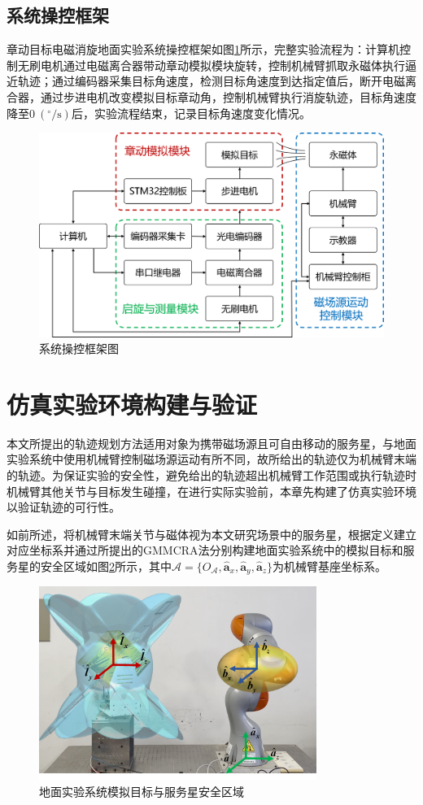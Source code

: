 \documentclass[lang=chs, degree=master, blindreview=false, winfonts=true]{yanputhesis}
\begin{document}
\subsection{系统操控框架}
章动目标电磁消旋地面实验系统操控框架如图\ref{fig:sys_box}所示，完整实验流程为：计算机控制无刷电机通过电磁离合器带动章动模拟模块旋转，控制机械臂抓取永磁体执行逼近轨迹；通过编码器采集目标角速度，检测目标角速度到达指定值后，断开电磁离合器，通过步进电机改变模拟目标章动角，控制机械臂执行消旋轨迹，目标角速度降至$0\ (\mathrm{^\circ/s})$后，实验流程结束，记录目标角速度变化情况。
\begin{figure}[htbp]
	\centering
	\includegraphics[width = 5.4in]{picture/sys_box.png}
	\caption{系统操控框架图}
	\label{fig:sys_box}
\end{figure}


\section{仿真实验环境构建与验证}
本文所提出的轨迹规划方法适用对象为携带磁场源且可自由移动的服务星，与地面实验系统中使用机械臂控制磁场源运动有所不同，故所给出的轨迹仅为机械臂末端的轨迹。为保证实验的安全性，避免给出的轨迹超出机械臂工作范围或执行轨迹时机械臂其他关节与目标发生碰撞，在进行实际实验前，本章先构建了仿真实验环境以验证轨迹的可行性。

如前所述，将机械臂末端关节与磁体视为本文研究场景中的服务星，根据定义建立对应坐标系并通过所提出的GMMCRA法分别构建地面实验系统中的模拟目标和服务星的安全区域如图\ref{fig:sys_safezone}所示，其中$\mathcal{A} = \{ {O_\mathcal{A}},{{\boldsymbol{\hat a}}_x},{{\boldsymbol{\hat a}}_y},{{\boldsymbol{\hat a}}_z}\} $为机械臂基座坐标系。
\begin{figure}[htbp]
	\centering
	\includegraphics[width = 3.55in]{picture/sys_safezone.png}
	\caption{地面实验系统模拟目标与服务星安全区域}
	\label{fig:sys_safezone}
\end{figure}
\end{document}
